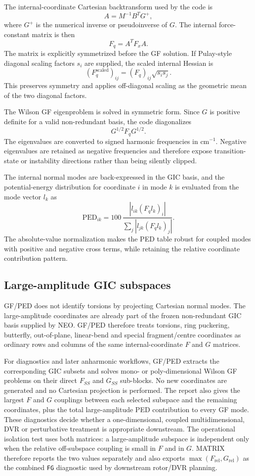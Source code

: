 \documentclass[11pt]{article}
\begin{document}
The internal-coordinate Cartesian backtransform used by the code is
\[
  A = M^{-1} B^T G^+ ,
\]
where \(G^+\) is the numerical inverse or pseudoinverse of \(G\).  The internal
force-constant matrix is then
\[
  F_q = A^T F_x A .
\]
The matrix is explicitly symmetrized before the GF solution.  If Pulay-style
diagonal scaling factors \(s_i\) are supplied, the scaled internal Hessian is
\[
  (F_q^\mathrm{scaled})_{ij}
  =
  (F_q)_{ij}\sqrt{s_i s_j}.
\]
This preserves symmetry and applies off-diagonal scaling as the geometric mean
of the two diagonal factors.

The Wilson GF eigenproblem is solved in symmetric form.  Since \(G\) is
positive definite for a valid non-redundant basis, the code diagonalizes
\[
  G^{1/2} F_q G^{1/2}.
\]
The eigenvalues are converted to signed harmonic frequencies in cm\(^{-1}\).
Negative eigenvalues are retained as negative frequencies and therefore expose
transition-state or instability directions rather than being silently clipped.

The internal normal modes are back-expressed in the GIC basis, and the
potential-energy distribution for coordinate \(i\) in mode \(k\) is evaluated
from the mode vector \(l_k\) as
\[
  \mathrm{PED}_{ik}
  =
  100\,
  \frac{|l_{ik}(F_q l_k)_i|}
       {\sum_j |l_{jk}(F_q l_k)_j|}.
\]
The absolute-value normalization makes the PED table robust for coupled modes
with positive and negative cross terms, while retaining the relative
coordinate contribution pattern.

\subsection{Large-amplitude GIC subspaces}

GF/PED does not identify torsions by projecting Cartesian normal modes.  The
large-amplitude coordinates are already part of the frozen non-redundant GIC
basis supplied by NEO.  GF/PED therefore treats torsions, ring puckering,
butterfly, out-of-plane, linear-bend and special fragment/centre coordinates
as ordinary rows and columns of the same internal-coordinate \(F\) and \(G\)
matrices.

For diagnostics and later anharmonic workflows, GF/PED extracts the
corresponding GIC subsets and solves mono- or poly-dimensional Wilson GF
problems on their direct \(F_{SS}\) and \(G_{SS}\) sub-blocks.  No new
coordinates are generated and no Cartesian projection is performed.  The
report also gives the largest \(F\) and \(G\) couplings between each selected
subspace and the remaining coordinates, plus the total large-amplitude PED
contribution to every GF mode.  These diagnostics decide whether a
one-dimensional, coupled multidimensional, DVR or perturbative treatment is
appropriate downstream.
The operational isolation test uses both matrices: a large-amplitude subspace
is independent only when the relative off-subspace coupling is small in \(F\)
and in \(G\).  MATRIX therefore reports the two values separately and also
exports \(\max(F_{\mathrm{rel}},G_{\mathrm{rel}})\) as the combined
\texttt{FG} diagnostic used by downstream rotor/DVR planning.
\end{document}
